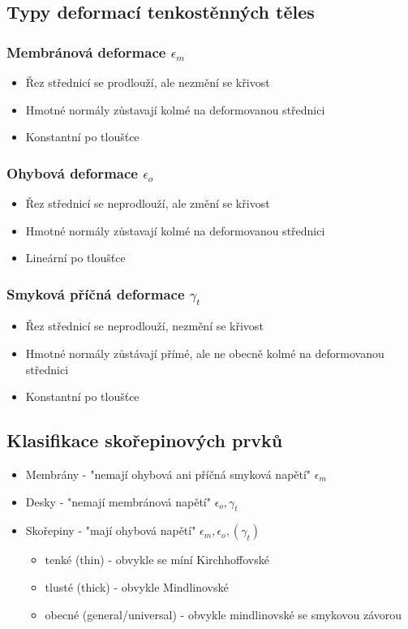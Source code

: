 \documentclass[10pt,oneside]{article}
\begin{document}
\subsection*{Typy deformací tenkostěnných těles}

\subsubsection*{Membránová deformace $\epsilon_m$}
\begin{itemize}
	\item Řez střednicí se prodlouží, ale nezmění se křivost
	\item Hmotné normály zůstavají kolmé na deformovanou střednici
	\item Konstantní po tloušťce
\end{itemize}

\subsubsection*{Ohybová deformace $\epsilon_o$}
\begin{itemize}
	\item Řez střednicí se neprodlouží, ale změní se křivost
	\item Hmotné normály zůstavají kolmé na deformovanou střednici
	\item Lineární po tloušťce
\end{itemize}

\subsubsection*{Smyková příčná deformace $\gamma_t$}
\begin{itemize}
	\item Řez střednicí se neprodlouží, nezmění se křivost
	\item Hmotné normály zůstávají přímé, ale ne obecně kolmé na deformovanou střednici
	\item Konstantní po tloušťce
\end{itemize}

\subsection*{Klasifikace skořepinových prvků}
\begin{itemize}
\item Membrány - "nemají ohybová ani příčná smyková napětí" $\epsilon_m$
\item Desky - "nemají membránová napětí" $\epsilon_o, \gamma_t$
\item Skořepiny - "mají ohybová napětí" $\epsilon_m, \epsilon_o, (\gamma_t)$
	\begin{itemize}
	\item tenké (thin) - obvykle se míní Kirchhoffovské
	\item tlusté (thick) - obvykle Mindlinovské
	\item obecné (general/universal) - obvykle mindlinovské se smykovou závorou
	\end{itemize}
\end{itemize}
\end{document}
